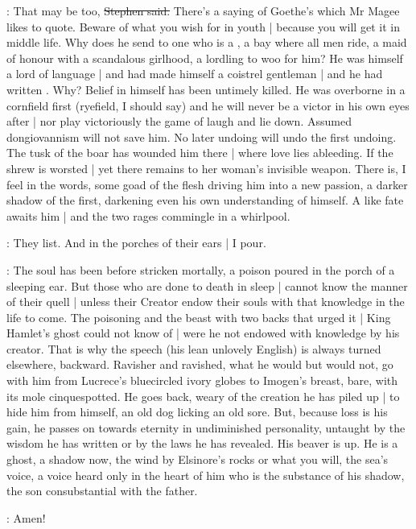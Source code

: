 \Stephen:
That may be too,
\sout{Stephen said.}
There's a saying of Goethe's
which Mr Magee likes to quote.
Beware of what you wish for in youth |
because you will get it in middle life.
Why does he send to one who is a ,
a bay where all men ride,
a maid of honour with a scandalous girlhood,
a lordling to woo for him?
He was himself a lord of language |
and had made himself a coistrel gentleman |
and he had written .
Why?
Belief in himself has been untimely killed.
He was overborne in a cornfield first
(ryefield, I should say)
and he will never be a victor in his own eyes after |
nor play victoriously the game of laugh and lie down.
Assumed dongiovannism will not save him.
No later undoing will undo the first undoing.
The tusk of the boar has wounded him there |
where love lies ableeding.
If the shrew is worsted |
yet there remains to her woman's invisible weapon.
There is,
I feel in the words,
some goad of the flesh driving him into a new passion,
a darker shadow of the first,
darkening even his own understanding of himself.
A like fate awaits him |
and the two rages commingle in a whirlpool.

\StephenInt:
They list.
And in the porches of their ears |
I pour.

\Stephen:
The soul has been before stricken mortally,
a poison poured in the porch of a sleeping ear.
But those who are done to death in sleep |
cannot know the manner of their quell |
unless their Creator endow their souls
with that knowledge in the life to come.
The poisoning and the beast with two backs that urged it |
King Hamlet's ghost could not know of |
were he not endowed with knowledge by his creator.
That is why the speech
(his lean unlovely English)
is always turned elsewhere, backward.
Ravisher and ravished,
what he would but would not,
go with him from Lucrece's bluecircled ivory globes to Imogen's breast,
bare, with its mole cinquespotted.
He goes back,
weary of the creation he has piled up |
to hide him from himself,
an old dog licking an old sore.
But, because loss is his gain,
he passes on towards eternity in undiminished personality,
untaught by the wisdom he has written
or by the laws he has revealed.
His beaver is up.
He is a ghost, a shadow now,
the wind by Elsinore's rocks or what you will,
the sea's voice,
a voice heard only in the heart of him
who is the substance of his shadow,
the son consubstantial with the father.

\mulligan:
Amen!

